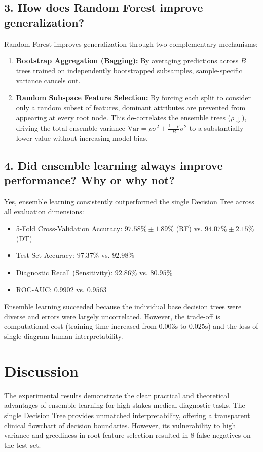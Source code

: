 \documentclass[12pt,a4paper]{article}
\begin{document}
\subsection*{3. How does Random Forest improve generalization?}
Random Forest improves generalization through two complementary mechanisms:
\begin{enumerate}
\item \textbf{Bootstrap Aggregation (Bagging):} By averaging predictions across $B$ trees trained on independently bootstrapped subsamples, sample-specific variance cancels out.
\item \textbf{Random Subspace Feature Selection:} By forcing each split to consider only a random subset of features, dominant attributes are prevented from appearing at every root node. This de-correlates the ensemble trees ($\rho \downarrow$), driving the total ensemble variance $\text{Var} = \rho \sigma^2 + \frac{1-\rho}{B}\sigma^2$ to a substantially lower value without increasing model bias.
\end{enumerate}

\subsection*{4. Did ensemble learning always improve performance? Why or why not?}
Yes, ensemble learning consistently outperformed the single Decision Tree across all evaluation dimensions:
\begin{itemize}
\item 5-Fold Cross-Validation Accuracy: $97.58\% \pm 1.89\%$ (RF) vs. $94.07\% \pm 2.15\%$ (DT)
\item Test Set Accuracy: $97.37\%$ vs. $92.98\%$
\item Diagnostic Recall (Sensitivity): $92.86\%$ vs. $80.95\%$
\item ROC-AUC: $0.9902$ vs. $0.9563$
\end{itemize}
Ensemble learning succeeded because the individual base decision trees were diverse and errors were largely uncorrelated. However, the trade-off is computational cost (training time increased from $0.003\text{s}$ to $0.025\text{s}$) and the loss of single-diagram human interpretability.

\section{Discussion}
The experimental results demonstrate the clear practical and theoretical advantages of ensemble learning for high-stakes medical diagnostic tasks. The single Decision Tree provides unmatched interpretability, offering a transparent clinical flowchart of decision boundaries. However, its vulnerability to high variance and greediness in root feature selection resulted in 8 false negatives on the test set.
\end{document}
